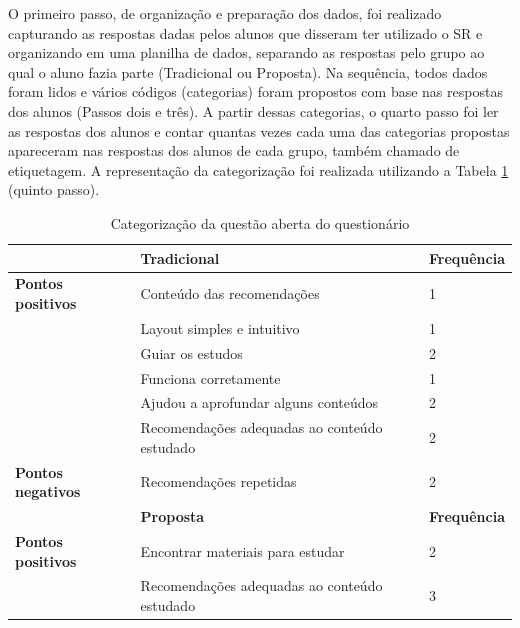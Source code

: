 O primeiro passo, de organização e preparação dos dados, foi realizado capturando as respostas dadas pelos alunos que disseram
ter utilizado o SR e organizando em uma planilha de dados, separando as respostas pelo grupo ao qual o aluno fazia parte
(Tradicional ou Proposta). Na sequência, todos dados foram lidos e vários códigos (categorias) foram propostos com base
nas respostas dos alunos (Passos dois e três). A partir dessas categorias, o quarto passo foi ler as respostas dos alunos
e contar quantas vezes cada uma das categorias propostas apareceram nas respostas dos alunos de cada grupo, também
chamado de etiquetagem. A representação da categorização foi realizada utilizando a Tabela \ref{ref:categorizacao-questao-aberta} (quinto passo).

\begin{table}[h]
\centering
\caption{Categorização da questão aberta do questionário}
\label{ref:categorizacao-questao-aberta}
\footnotesize
\begin{tabular}{|p{3cm}|p{10cm}|p{2cm}|}
\hline
                          & \textbf{Tradicional}                                           & \textbf{Frequência} \\
\hline
\textbf{Pontos positivos} & Conteúdo das recomendações                                     & 1          \\
                          & Layout simples e intuitivo                                     & 1          \\
                          & Guiar os estudos                                               & 2          \\
                          & Funciona corretamente                                          & 1          \\
                          & Ajudou a aprofundar alguns conteúdos                           & 2          \\
                          & Recomendações adequadas ao conteúdo estudado                   & 2          \\
\hline
\textbf{Pontos negativos} & Recomendações repetidas                                        & 2          \\
\hline
                          & \textbf{Proposta}                                              & \textbf{Frequência} \\
\hline
\textbf{Pontos positivos} & Encontrar materiais para estudar                               & 2          \\
                          & Recomendações adequadas ao conteúdo estudado                   & 3          \\

\end{tabular}
\end{table}
